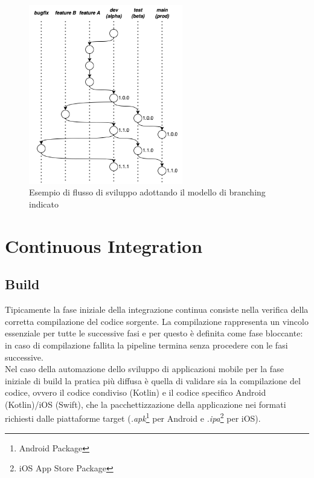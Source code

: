 \begin{figure}[H]
\centering
\includegraphics[width=0.6\textwidth]{img/tesi-13-branching.drawio.png}
\caption{Esempio di flusso di sviluppo adottando il modello di branching indicato}
\end{figure}

\section{Continuous Integration}

\subsection{Build}
Tipicamente la fase iniziale della integrazione continua consiste nella verifica della corretta compilazione del codice sorgente. La compilazione rappresenta un vincolo essenziale per tutte le successive fasi e per questo è definita come fase bloccante: in caso di compilazione fallita la pipeline termina senza procedere con le fasi successive.\\
Nel caso della automazione dello sviluppo di applicazioni mobile per la fase iniziale di build la pratica più diffusa è quella di validare sia la compilazione del codice, ovvero il codice condiviso (Kotlin) e il codice specifico Android (Kotlin)/iOS (Swift), che la pacchettizzazione della applicazione nei formati richiesti dalle piattaforme target (\textit{.apk}\footnote{Android Package} per Android e \textit{.ipa}\footnote{iOS App Store Package} per iOS).

